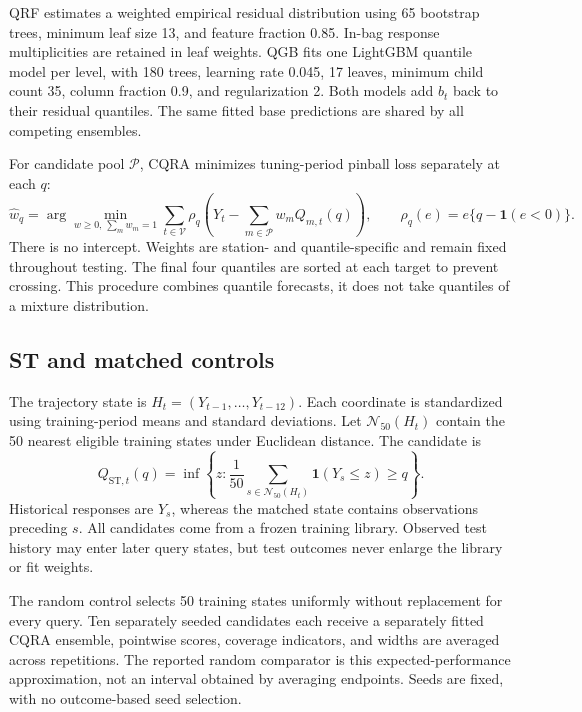 \documentclass[11pt]{article}
\newcommand{\V}{\mathcal V}
\newcommand{\N}{\mathcal N}
\newcommand{\ind}{\mathbf 1}
\newcommand{\ST}{\mathrm{ST}}
\begin{document}
QRF estimates a weighted empirical residual distribution using 65 bootstrap trees, minimum leaf size 13, and feature fraction 0.85. In-bag response multiplicities are retained in leaf weights. QGB fits one LightGBM quantile model per level, with 180 trees, learning rate 0.045, 17 leaves, minimum child count 35, column fraction 0.9, and regularization 2. Both models add $b_t$ back to their residual quantiles. The same fitted base predictions are shared by all competing ensembles.

For candidate pool $\mathcal P$, CQRA minimizes tuning-period pinball loss separately at each $q$:
\begin{equation}\label{eq:cqra}
\widehat w_q=\arg\min_{w\geq0,\,\sum_m w_m=1}
\sum_{t\in\V}\rho_q\!\left(Y_t-\sum_{m\in\mathcal P}w_m Q_{m,t}(q)\right),
\qquad \rho_q(e)=e\{q-\ind(e<0)\}.
\end{equation}
There is no intercept. Weights are station- and quantile-specific and remain fixed throughout testing. The final four quantiles are sorted at each target to prevent crossing. This procedure combines quantile forecasts, it does not take quantiles of a mixture distribution.

\subsection{ST and matched controls}
The trajectory state is $H_t=(Y_{t-1},\ldots,Y_{t-12})$. Each coordinate is standardized using training-period means and standard deviations. Let $\N_{50}(H_t)$ contain the 50 nearest eligible training states under Euclidean distance. The candidate is
\begin{equation}\label{eq:st}
Q_{\ST,t}(q)=\inf\left\{z:\frac1{50}\sum_{s\in\N_{50}(H_t)}\ind(Y_s\leq z)\geq q\right\}.
\end{equation}
Historical responses are $Y_s$, whereas the matched state contains observations preceding $s$. All candidates come from a frozen training library. Observed test history may enter later query states, but test outcomes never enlarge the library or fit weights.

The random control selects 50 training states uniformly without replacement for every query. Ten separately seeded candidates each receive a separately fitted CQRA ensemble, pointwise scores, coverage indicators, and widths are averaged across repetitions. The reported random comparator is this expected-performance approximation, not an interval obtained by averaging endpoints. Seeds are fixed, with no outcome-based seed selection.
\end{document}
